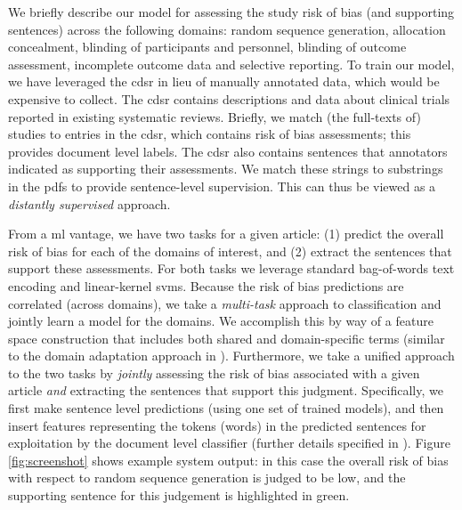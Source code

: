 \documentclass[runningheads,a4paper]{llncs}
\begin{document}
We briefly describe our model for assessing the study risk of bias (and supporting sentences) across the following domains: random sequence generation, allocation concealment, blinding of participants and personnel, blinding of outcome assessment, incomplete outcome data and selective reporting.
To train our model, we have leveraged the \ac{cdsr} in lieu of manually annotated data, which would be expensive to collect.
The \ac{cdsr} contains descriptions and data about clinical trials reported in existing systematic reviews.
Briefly, we match (the full-texts of) studies to entries in the \ac{cdsr}, which contains risk of bias assessments; this provides document level labels.
The \ac{cdsr} also contains sentences that annotators indicated as supporting their assessments.
We match these strings to substrings in the \acp{pdf} to provide sentence-level supervision.
This can thus be viewed as a \emph{distantly supervised} \cite{mintz-09,nguyen-11} approach.

From a \ac{ml} vantage, we have two tasks for a given article: (1) predict the overall risk of bias for each of the domains of interest, and (2) extract the sentences that support these assessments.
For both tasks we leverage standard bag-of-words text encoding and linear-kernel \acp{svm}.
Because the risk of bias predictions are correlated (across domains), we take a \emph{multi-task} \cite{evgeniou2004} approach to classification and jointly learn a model for the domains.
We accomplish this by way of a feature space construction that includes both shared and domain-specific terms (similar to the domain adaptation approach in \cite{daume2007}).
Furthermore, we take a unified approach to the two tasks by \emph{jointly} assessing the risk of bias associated with a given article \emph{and} extracting the sentences that support this judgment.
Specifically, we first make sentence level predictions (using one set of trained models), and then insert features representing the tokens (words) in the predicted sentences for exploitation by the document level classifier (further details specified in \cite{marshall2014}).
Figure \ref{fig:screenshot} shows example system output: in this case the overall risk of bias with respect to random sequence generation is judged to be low, and the supporting sentence for this judgement is highlighted in green.
\end{document}
